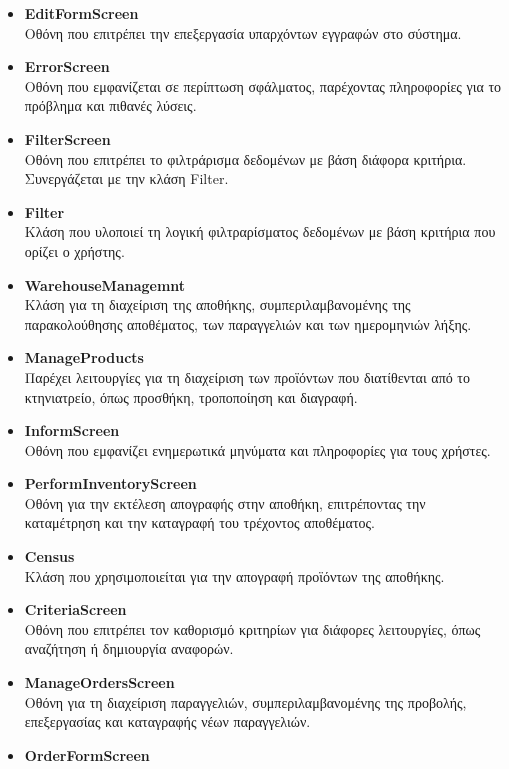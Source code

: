 \documentclass[12pt,a4paper,twoside]{book}
\begin{document}
\begin{itemize}
    \item \textbf{EditFormScreen}\\
          Οθόνη που επιτρέπει την επεξεργασία υπαρχόντων εγγραφών στο σύστημα.
    \item \textbf{ErrorScreen}\\
          Οθόνη που εμφανίζεται σε περίπτωση σφάλματος, παρέχοντας πληροφορίες για το πρόβλημα και πιθανές λύσεις.
    \item \textbf{FilterScreen}\\
          Οθόνη που επιτρέπει το φιλτράρισμα δεδομένων με βάση διάφορα κριτήρια. Συνεργάζεται με την κλάση Filter. %
    \item \textbf{Filter}\\
          Κλάση που υλοποιεί τη λογική φιλτραρίσματος δεδομένων με βάση κριτήρια που ορίζει ο χρήστης. %
    \item \textbf{WarehouseManagemnt}\\
          Κλάση για τη διαχείριση της αποθήκης, συμπεριλαμβανομένης της παρακολούθησης αποθέματος, των παραγγελιών και των ημερομηνιών λήξης. %
    \item \textbf{ManageProducts}\\
          Παρέχει λειτουργίες για τη διαχείριση των προϊόντων που διατίθενται από το κτηνιατρείο, όπως προσθήκη, τροποποίηση και διαγραφή. %
    \item \textbf{InformScreen}\\
          Οθόνη που εμφανίζει ενημερωτικά μηνύματα και πληροφορίες για τους χρήστες.
    \item \textbf{PerformInventoryScreen}\\
          Οθόνη για την εκτέλεση απογραφής στην αποθήκη, επιτρέποντας την καταμέτρηση και την καταγραφή του τρέχοντος αποθέματος.
    \item \textbf{Census}\\
          Κλάση που χρησιμοποιείται για την απογραφή προϊόντων της αποθήκης. %
    \item \textbf{CriteriaScreen}\\
          Οθόνη που επιτρέπει τον καθορισμό κριτηρίων για διάφορες λειτουργίες, όπως αναζήτηση ή δημιουργία αναφορών. %
    \item \textbf{ManageOrdersScreen}\\
          Οθόνη για τη διαχείριση παραγγελιών, συμπεριλαμβανομένης της προβολής, επεξεργασίας και καταγραφής νέων παραγγελιών. %
    \item \textbf{OrderFormScreen}\\

\end{itemize}
\end{document}
